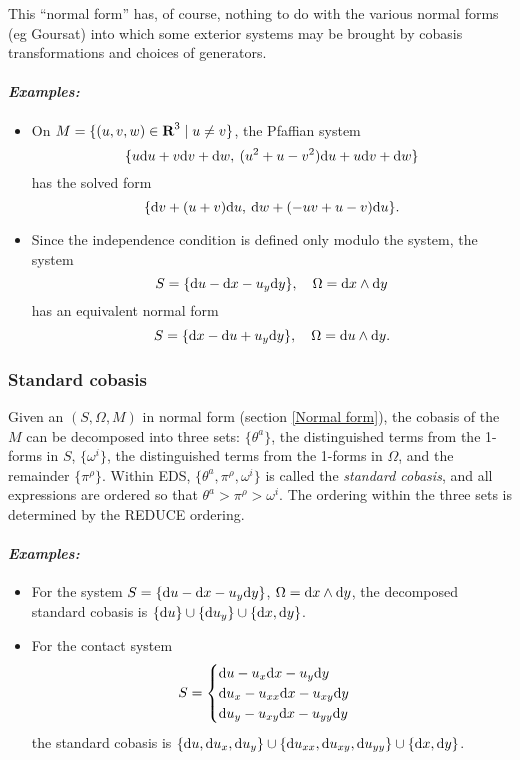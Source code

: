 This ``normal form'' has, of course, nothing to do with the various normal 
forms (eg Goursat) into which some exterior systems may be brought by
cobasis transformations and choices of generators.

\paragraph{\it Examples:}
\begin{itemize}
\item On $M=\{(u,v,w)\in\hbox{\bf R}^3\mid u\neq v\}$, the Pfaffian system
      $$\{u\mathrm{d} u + v\mathrm{d} v + \mathrm{d} w,\>(u^2 + u - v^2)\mathrm{d} u + u\mathrm{d} v + \mathrm{d} w\}$$ has
      the solved form
      $$\{\mathrm{d} v + (u + v)\mathrm{d} u,\>\mathrm{d} w + ( - uv + u - v )\mathrm{d} u\}.$$
\item Since the independence condition is defined only modulo the system,
      the system
      $$S=\{\mathrm{d} u - \mathrm{d} x - u_y\mathrm{d} y\},\quad \Omega=\mathrm{d} x\wedge\mathrm{d} y$$ has an
      equivalent normal form
      $$S=\{\mathrm{d} x - \mathrm{d} u + u_y\mathrm{d} y\},\quad \Omega=\mathrm{d} u\wedge\mathrm{d} y.$$
\end{itemize}

\subsubsection{Standard cobasis}
\label{Standard cobasis}

Given an  $(S,\Omega,M)$ in normal form (section \ref{Normal
form}), the cobasis of the  $M$ can be decomposed into three
sets: $\{\theta^a\}$, the distinguished terms from the 1-forms in $S$,
$\{\omega^i\}$, the distinguished terms from the 1-forms in $\Omega$, and
the remainder $\{\pi^\rho\}$. Within EDS, $\{\theta^a,\pi^\rho,\omega^i\}$
is called the {\em standard cobasis}, and all expressions are ordered so
that $\theta^a > \pi^\rho > \omega^i$. The ordering within the three sets
is determined by the REDUCE  ordering.

\paragraph{\it Examples:}
\begin{itemize}
\item For the system $S=\{\mathrm{d} u - \mathrm{d} x - u_y\mathrm{d} y\}$, $\Omega=\mathrm{d} x\wedge\mathrm{d} y$,
      the decomposed standard cobasis is $\{\mathrm{d} u\}\cup\{\mathrm{d} u_y\}\cup\{\mathrm{d}
      x,\mathrm{d} y\}$.
\item For the contact system 
  \[S=\begin{cases}
                \mathrm{d} u - u_x\mathrm{d} x - u_y\mathrm{d} y\\
                \mathrm{d} u_x - u_{xx}\mathrm{d} x - u_{xy}\mathrm{d} y\\
                \mathrm{d} u_y - u_{xy}\mathrm{d} x - u_{yy}\mathrm{d} y
       \end{cases}\]
      the standard cobasis is $\{\mathrm{d} u,\mathrm{d} u_x,\mathrm{d} u_y\}\cup\{\mathrm{d}
      u_{xx},\mathrm{d} u_{xy},\mathrm{d} u_{yy}\}\cup\{\mathrm{d} x,\mathrm{d} y\}$.

\end{itemize}


